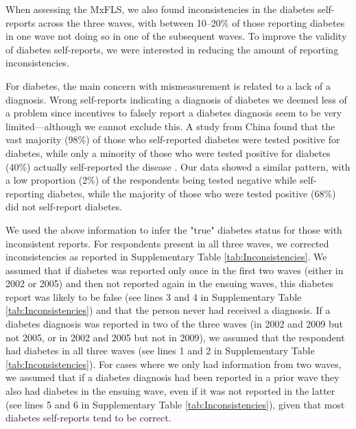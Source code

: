 \documentclass[12pt,english]{article}
\begin{document}
When assessing the \ac{MxFLS}, we also found inconsistencies in the diabetes self-reports across the three waves, with between 10--20\% of those reporting diabetes in one wave not doing so in one of the subsequent waves. To improve the validity of diabetes self-reports, we were interested in reducing the amount of reporting inconsistencies.

For diabetes, the main concern with mismeasurement is related to a lack of a diagnosis. Wrong self-reports indicating a diagnosis of diabetes we deemed less of a problem since incentives to falsely report a diabetes diagnosis seem to be very limited---although we cannot exclude this.  A study from China found that the vast majority (98\%) of those who self-reported diabetes were tested positive for diabetes, while only a minority  of those who were tested positive for diabetes (40\%) actually self-reported the disease \parencite{Yuan2015}.  Our data showed a similar pattern, with a low proportion (2\%) of the respondents being tested negative while self-reporting diabetes, while the majority of those who were tested positive (68\%) did not self-report diabetes.

We used the above information to infer the "true" diabetes status for those with inconsistent reports. For respondents present in all three waves, we corrected inconsistencies as reported in Supplementary Table \ref{tab:Inconsistencies}. We assumed that if diabetes was reported only once in the first two waves (either in 2002 or 2005) and then not reported again in the ensuing waves, this diabetes report was likely to be false (see lines 3 and 4 in Supplementary Table \ref{tab:Inconsistencies}) and that the person never had received a diagnosis. If a diabetes diagnosis was reported in two of the three waves (in 2002 and 2009 but not 2005, or in 2002 and 2005 but not in 2009), we assumed that the respondent had diabetes in all three waves (see lines 1 and 2 in Supplementary Table \ref{tab:Inconsistencies}). For cases where we only had information from two waves, we assumed that if a diabetes diagnosis had been reported in a prior wave they also had diabetes in the ensuing wave, even if it was not reported in the latter (see lines 5 and 6 in Supplementary Table \ref{tab:Inconsistencies}), given that most diabetes self-reports tend to be correct.
\end{document}

